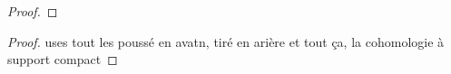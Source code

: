 \begin{definition}\label{def:orientation_sheaf_of_a_manifold}

\end{definition}

\begin{lemma}\label{lem:Homotopy_k-sheaf_axioms_for_singular_chain}

\end{lemma}

\begin{proof}

\end{proof}

\begin{lemma}\label{lem:poincare-lefschetz_duality}

\end{lemma}

\begin{proof}
    uses tout les poussé en avatn, tiré en arière et tout ça, la cohomologie à support compact 
\end{proof}